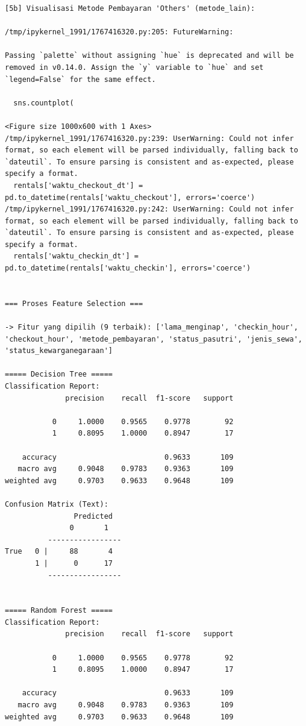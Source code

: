 \begin{lstlisting}[caption={Output 13}]
[5b] Visualisasi Metode Pembayaran 'Others' (metode_lain):

/tmp/ipykernel_1991/1767416320.py:205: FutureWarning: 

Passing `palette` without assigning `hue` is deprecated and will be removed in v0.14.0. Assign the `y` variable to `hue` and set `legend=False` for the same effect.

  sns.countplot(

<Figure size 1000x600 with 1 Axes>
/tmp/ipykernel_1991/1767416320.py:239: UserWarning: Could not infer format, so each element will be parsed individually, falling back to `dateutil`. To ensure parsing is consistent and as-expected, please specify a format.
  rentals['waktu_checkout_dt'] = pd.to_datetime(rentals['waktu_checkout'], errors='coerce')
/tmp/ipykernel_1991/1767416320.py:242: UserWarning: Could not infer format, so each element will be parsed individually, falling back to `dateutil`. To ensure parsing is consistent and as-expected, please specify a format.
  rentals['waktu_checkin_dt'] = pd.to_datetime(rentals['waktu_checkin'], errors='coerce')


=== Proses Feature Selection ===

-> Fitur yang dipilih (9 terbaik): ['lama_menginap', 'checkin_hour', 'checkout_hour', 'metode_pembayaran', 'status_pasutri', 'jenis_sewa', 'status_kewarganegaraan']

===== Decision Tree =====
Classification Report:
              precision    recall  f1-score   support

           0     1.0000    0.9565    0.9778        92
           1     0.8095    1.0000    0.8947        17

    accuracy                         0.9633       109
   macro avg     0.9048    0.9783    0.9363       109
weighted avg     0.9703    0.9633    0.9648       109

Confusion Matrix (Text):
                Predicted
               0       1
          -----------------
True   0 |     88       4
       1 |      0      17
          -----------------


===== Random Forest =====
Classification Report:
              precision    recall  f1-score   support

           0     1.0000    0.9565    0.9778        92
           1     0.8095    1.0000    0.8947        17

    accuracy                         0.9633       109
   macro avg     0.9048    0.9783    0.9363       109
weighted avg     0.9703    0.9633    0.9648       109


\end{lstlisting}
